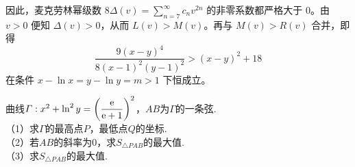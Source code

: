 \begin{solution}
因此，麦克劳林幂级数 $8\Delta(v) = \sum_{n=7}^{\infty} c_n v^{2n}$ 的非零系数都严格大于 $0$。由 $v > 0$ 便知 $\Delta(v) > 0$，从而 $L(v) > M(v)$。再与 $M(v) > R(v)$ 合并，即得
$$ \frac{9(x-y)^4}{8(x-1)^2(y-1)^2} > (x-y)^2 + 18 $$
在条件 $x-\ln x = y-\ln y = m > 1$ 下恒成立。
\end{solution}

\newpage
\begin{example}[曲线面积最大值]
    曲线$\varGamma :x^2+\ln^2y=\left(\dfrac{\mathrm{e}}{\mathrm{e}+1}\right)^2$，$AB$为$\varGamma$的一条弦.\\
    （1）求$\varGamma$的最高点$P$，最低点$Q$的坐标.\\
    （2）若$AB$的斜率为0，求$S_{\triangle{PAB}}$的最大值.\\
    （3）求$S_{\triangle{PAB}}$的最大值.
\end{example}
